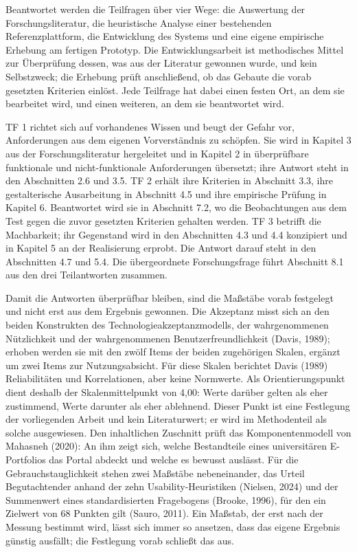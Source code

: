 Beantwortet werden die Teilfragen über vier Wege: die Auswertung der Forschungsliteratur, die heuristische Analyse einer bestehenden Referenzplattform, die Entwicklung des Systems und eine eigene empirische Erhebung am fertigen Prototyp. Die Entwicklungsarbeit ist methodisches Mittel zur Überprüfung dessen, was aus der Literatur gewonnen wurde, und kein Selbstzweck; die Erhebung prüft anschließend, ob das Gebaute die vorab gesetzten Kriterien einlöst. Jede Teilfrage hat dabei einen festen Ort, an dem sie bearbeitet wird, und einen weiteren, an dem sie beantwortet wird.

TF 1 richtet sich auf vorhandenes Wissen und beugt der Gefahr vor, Anforderungen aus dem eigenen Vorverständnis zu schöpfen. Sie wird in Kapitel 3 aus der Forschungsliteratur hergeleitet und in Kapitel 2 in überprüfbare funktionale und nicht-funktionale Anforderungen übersetzt; ihre Antwort steht in den Abschnitten 2.6 und 3.5. TF 2 erhält ihre Kriterien in Abschnitt 3.3, ihre gestalterische Ausarbeitung in Abschnitt 4.5 und ihre empirische Prüfung in Kapitel 6. Beantwortet wird sie in Abschnitt 7.2, wo die Beobachtungen aus dem Test gegen die zuvor gesetzten Kriterien gehalten werden. TF 3 betrifft die Machbarkeit; ihr Gegenstand wird in den Abschnitten 4.3 und 4.4 konzipiert und in Kapitel 5 an der Realisierung erprobt. Die Antwort darauf steht in den Abschnitten 4.7 und 5.4. Die übergeordnete Forschungsfrage führt Abschnitt 8.1 aus den drei Teilantworten zusammen.

Damit die Antworten überprüfbar bleiben, sind die Maßstäbe vorab festgelegt und nicht erst aus dem Ergebnis gewonnen. Die Akzeptanz misst sich an den beiden Konstrukten des Technologieakzeptanzmodells, der wahrgenommenen Nützlichkeit und der wahrgenommenen Benutzerfreundlichkeit (Davis, 1989); erhoben werden sie mit den zwölf Items der beiden zugehörigen Skalen, ergänzt um zwei Items zur Nutzungsabsicht. Für diese Skalen berichtet Davis (1989) Reliabilitäten und Korrelationen, aber keine Normwerte. Als Orientierungspunkt dient deshalb der Skalenmittelpunkt von 4,00: Werte darüber gelten als eher zustimmend, Werte darunter als eher ablehnend. Dieser Punkt ist eine Festlegung der vorliegenden Arbeit und kein Literaturwert; er wird im Methodenteil als solche ausgewiesen. Den inhaltlichen Zuschnitt prüft das Komponentenmodell von Mahasneh (2020): An ihm zeigt sich, welche Bestandteile eines universitären E-Portfolios das Portal abdeckt und welche es bewusst auslässt. Für die Gebrauchstauglichkeit stehen zwei Maßstäbe nebeneinander, das Urteil Begutachtender anhand der zehn Usability-Heuristiken (Nielsen, 2024) und der Summenwert eines standardisierten Fragebogens (Brooke, 1996), für den ein Zielwert von 68 Punkten gilt (Sauro, 2011). Ein Maßstab, der erst nach der Messung bestimmt wird, lässt sich immer so ansetzen, dass das eigene Ergebnis günstig ausfällt; die Festlegung vorab schließt das aus.

